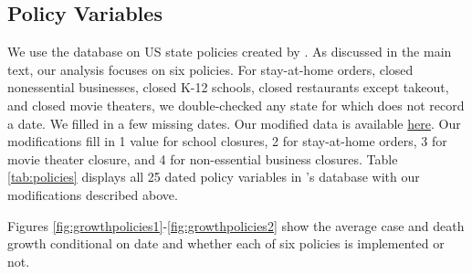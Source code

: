 \documentclass[11pt,reqno,letter]{amsart}
\theoremstyle{definition}
\begin{document}
\subsection{Policy Variables}

We use the database on US state policies created by
\cite{raifman2020}. %
As discussed in the main text, our analysis focuses on six policies. For stay-at-home orders, closed nonessential
businesses, closed K-12 schools, closed restaurants except takeout,
and closed movie theaters, we double-checked any
state for which \cite{raifman2020} does not record a date. We filled
in a few missing dates. Our modified data is available
\href{"https://docs.google.com/spreadsheets/d/1E6HRkgbdSnZ9ZxrneydU6q4hhOCCt9oTl_5fa3OFVZE/edit?usp=sharing}{here}. Our
modifications fill in 1 value for school closures, 2 for stay-at-home orders, 3 for movie theater closure, and 4 for
non-essential business closures. Table \ref{tab:policies} displays all 25 dated policy variables in
\cite{raifman2020}'s database with our modifications described above.

Figures \ref{fig:growthpolicies1}-\ref{fig:growthpolicies2} show the  average case and death growth conditional on date and whether each of six policies  is implemented or not.


\afterpage{%
  \clearpage%
  \thispagestyle{empty}%
  \begin{landscape}%
    \centering %
    
  \end{landscape}
  \clearpage%
}
\end{document}
